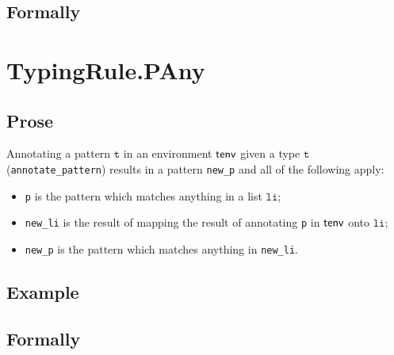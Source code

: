 \documentclass{book}
\newcommand\vt[0]{\texttt{t}}
\newcommand\vli[0]{\texttt{li}}
\begin{document}
\begin{emptyformal}
    \subsection{Formally}
\end{emptyformal}


\section{TypingRule.PAny\label{sec:TypingRule.PAny}}

  \subsection{Prose}
   Annotating a pattern $\vt$ in an environment $\textsf{tenv}$ given a type $\vt$ (\texttt{annotate\_pattern}) results in a pattern \texttt{new\_p} and all of the following apply:
   \begin{itemize}
   \item \texttt{p} is the pattern which matches anything in a list $\vli$;
   \item \texttt{new\_li} is the result of mapping the result of annotating \texttt{p} in $\textsf{tenv}$ onto $\vli$;
   \item \texttt{new\_p} is the pattern which matches anything in \texttt{new\_li}.
   \end{itemize}

  \subsection{Example}



\begin{emptyformal}
    \subsection{Formally}
\end{emptyformal}

\end{document}
